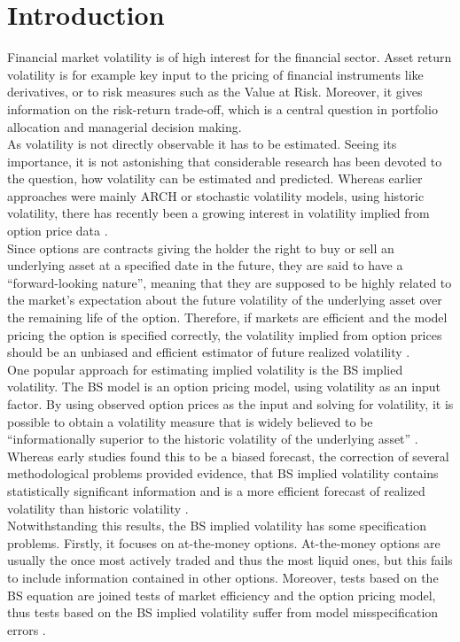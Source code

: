 
\section{Introduction}\label{sec:1Intro}
Financial market volatility is of high interest for the financial sector. Asset return volatility is for example key input to the pricing of financial instruments like derivatives, or to risk measures such as the Value at Risk. Moreover, it gives information on the risk-return trade-off, which is a central question in portfolio allocation and managerial decision making. \\
As volatility is not directly observable it has to be estimated. Seeing its importance, it is not astonishing that considerable research has been devoted to the question, how volatility can be estimated and predicted. Whereas earlier approaches were mainly ARCH or stochastic volatility models, using historic volatility, there has recently been a growing interest in volatility implied from option price data \parencite{bakanova2010}.\\
Since options are contracts giving the holder the right to buy or sell an underlying asset at a specified date in the future, they are said to have a ``forward-looking nature'', meaning that they are supposed to be highly related to the market's expectation about the future volatility of the underlying asset over the remaining life of the option. Therefore, if markets are efficient and the model pricing the option is specified correctly, the volatility implied from option prices should be an unbiased and efficient estimator of future realized volatility \parencite{bakanova2010}.\\
One popular approach for estimating implied volatility is the \ac{BS} implied volatility. The \ac{BS} model is an option pricing model, using volatility as an input factor. By using observed option prices as the input and solving for volatility, it is possible to obtain a volatility measure that is widely believed to be ``informationally superior to the historic volatility of the underlying asset'' \parencite[p. 1305]{jiang2003}. Whereas early studies found this to be a biased forecast, the correction of several methodological problems provided evidence, that \ac{BS} implied volatility contains statistically significant information and is a more efficient forecast of realized volatility than historic volatility \parencite{jiang2003}.\\
Notwithstanding this results, the \ac{BS} implied volatility has some specification problems. Firstly, it focuses on at-the-money options. At-the-money options are usually the once most actively traded and thus the most liquid ones, but this fails to include information contained in other options. Moreover, tests based on the \ac{BS} equation are joined tests of market efficiency and the option pricing model, thus tests based on the \ac{BS} implied volatility suffer from model misspecification errors \parencite{jiang2003}. \\
